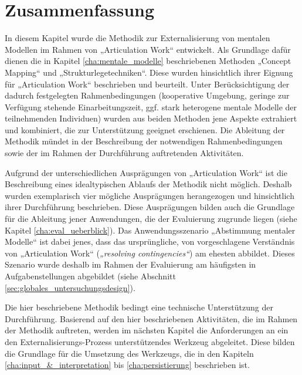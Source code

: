
\section{Zusammenfassung} %
\label{sec:methodik_zusammenfassung}

In diesem Kapitel wurde die Methodik zur Externalisierung von mentalen Modellen im Rahmen von „Articulation Work“ entwickelt. Als Grundlage dafür dienen die in Kapitel \ref{cha:mentale_modelle} beschriebenen Methoden „Concept Mapping“ und „Strukturlegetechniken“. Diese wurden hinsichtlich ihrer Eignung für „Articulation Work“ beschrieben und beurteilt. Unter Berücksichtigung der dadurch festgelegten Rahmenbedingungen (kooperative Umgebung, geringe zur Verfügung stehende Einarbeitungszeit, ggf. stark heterogene mentale Modelle der teilnehmenden Individuen) wurden aus beiden Methoden jene Aspekte extrahiert und kombiniert, die zur Unterstützung geeignet erschienen. Die Ableitung der Methodik mündet in der Beschreibung der notwendigen Rahmenbedingungen sowie der im Rahmen der Durchführung auftretenden Aktivitäten. 

Aufgrund der unterschiedlichen Ausprägungen von „Articulation Work“ ist die Beschreibung eines idealtypischen Ablaufs der Methodik nicht möglich. Deshalb wurden exemplarisch vier mögliche Ausprägungen herangezogen und hinsichtlich ihrer Durchführung beschrieben. Diese Ausprägungen bilden auch die Grundlage für die Ableitung jener Anwendungen, die der Evaluierung zugrunde liegen (siehe Kapitel \ref{cha:eval_ueberblick}). Das Anwendungsszenario „Abstimmung mentaler Modelle“ ist dabei jenes, dass das ursprüngliche, von \citep{Strauss85} vorgeschlagene Verständnis von „Articulation Work“ (\emph{„resolving contingencies“}) am ehesten abbildet. Dieses Szenario wurde deshalb im Rahmen der Evaluierung am häufigsten in Aufgabenstellungen abgebildet (siehe Abschnitt \ref{sec:globales_untersuchungsdesign}).

Die hier beschriebene Methodik bedingt eine technische Unterstützung der Durchführung. Basierend auf den hier beschriebenen Aktivitäten, die im Rahmen der Methodik auftreten, werden im nächsten Kapitel die Anforderungen an ein den Externalisierungs-Prozess unterstützendes Werkzeug abgeleitet. Diese bilden die Grundlage für die Umsetzung des Werkzeugs, die in den Kapiteln \ref{cha:input_&_interpretation} bis \ref{cha:persistierung} beschrieben ist. 



